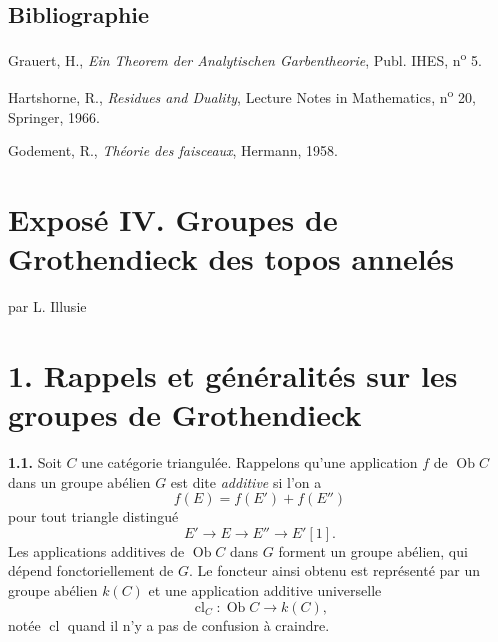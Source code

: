 \documentclass[11pt]{article}
\newcommand{\cl}{\operatorname{cl}}
\begin{document}
\subsection*{Bibliographie}
\begin{enumerate}[label={[\arabic*]}]
\item Grauert, H., \emph{Ein Theorem der Analytischen Garbentheorie}, Publ. IHES, n\textsuperscript{o} 5.
\item Hartshorne, R., \emph{Residues and Duality}, Lecture Notes in Mathematics, n\textsuperscript{o} 20, Springer, 1966.
\item Godement, R., \emph{Théorie des faisceaux}, Hermann, 1958.
\end{enumerate}



\providecommand{\Ob}{\operatorname{Ob}}
\providecommand{\Mod}{\operatorname{Mod}}
\providecommand{\Coh}{\operatorname{Coh}}
\providecommand{\Loclib}{\operatorname{Loclib}}
\providecommand{\coh}{\mathrm{coh}}
\providecommand{\parf}{\mathrm{parf}}
\providecommand{\naif}{\mathrm{naif}}
\providecommand{\loc}{\mathrm{loc}}
\providecommand{\fin}{\mathrm{fin}}
\providecommand{\clA}{\operatorname{cl}}
\providecommand{\Rg}{\operatorname{rg}}
\providecommand{\varinjlim}{\varinjlim}
\providecommand{\varprojlim}{\varprojlim}
\providecommand{\id}{\operatorname{id}}
\providecommand{\Th}{\operatorname{Th}}
\providecommand{\Hom}{\operatorname{Hom}}
\providecommand{\Dcat}{\mathrm D}
\providecommand{\Kcat}{\mathrm K}
\providecommand{\Kdot}{K_{\bullet}}
\providecommand{\Kprime}{K'}
\providecommand{\naif}{\mathrm{na\ddot{\i}f}}


\section*{Exposé IV. Groupes de Grothendieck des topos annelés}
\begin{center}
par L. Illusie
\end{center}

\section*{1. Rappels et généralités sur les groupes de Grothendieck}

\textbf{1.1.} Soit \(C\) une catégorie triangulée. Rappelons qu'une application \(f\) de \(\Ob C\) dans un groupe abélien \(G\) est dite \emph{additive} si l'on a
\[
 f(E)=f(E')+f(E'')
\]
pour tout triangle distingué
\[
 E'\longrightarrow E\longrightarrow E''\longrightarrow E'[1].
\]
Les applications additives de \(\Ob C\) dans \(G\) forment un groupe abélien, qui dépend fonctoriellement de \(G\). Le foncteur ainsi obtenu est représenté par un groupe abélien \(k(C)\) et une application additive universelle
\[
 \cl_C:\Ob C\longrightarrow k(C),
\]
notée \(\cl\) quand il n'y a pas de confusion à craindre.
\end{document}
